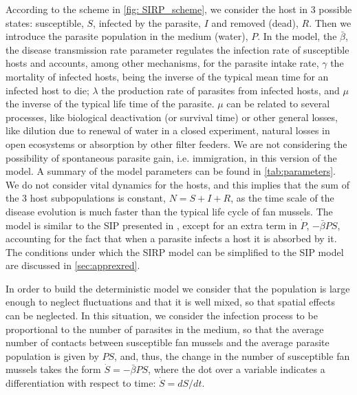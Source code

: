 According to the scheme in \cref{fig: SIRP_scheme}, we consider the host in 3
possible states: susceptible, $S$, infected by the parasite, $I$ and removed
(dead), $R$. Then we introduce the parasite population in the medium (water),
$P$. In the model, the $\bar{\beta}$, the disease transmission rate parameter
regulates the infection rate of susceptible hosts and accounts, among other
mechanisms, for the parasite intake rate,
$\gamma$ the mortality of infected hosts, being the inverse of the typical mean
time for an infected host to die; $\lambda$ the production rate of parasites
from infected hosts, and $\mu$ the inverse of the typical life time of the
parasite. $\mu$ can be related to several processes, like biological
deactivation (or survival time) or other general losses, like dilution due to
renewal of water in a closed experiment, natural losses in open ecosystems or
absorption by other filter feeders.
We are not considering the possibility of spontaneous parasite gain, i.e.
immigration, in this version of the model. A summary of the model parameters
can be found in \cref{tab:parameters}.
We do not consider vital dynamics for the hosts, and this implies that the sum
of the $3$ host subpopulations is constant, $N=S+I+R$, as the time scale of the
disease evolution is much faster than the typical life cycle of fan mussels.
The model is similar to the SIP presented in \cite{article_SIP}, except for an
extra term in $\dot{P}$, $-\bar{\beta}PS$, accounting for the fact that when a
parasite infects a host it is absorbed by it. The conditions under which the
SIRP model can be simplified to the SIP model are discussed in
\cref{sec:apprexred}.

In order to build the deterministic model we consider that the population
is large enough to neglect fluctuations and that it is well mixed, so that
spatial effects can be neglected.
In this situation, we consider the infection process to be proportional to
the number of parasites in the medium, so that the average number of contacts
between susceptible fan mussels and the average parasite population is given by
$PS$, and, thus, the change in the number of susceptible fan mussels takes the
form $\dot{S}=-\bar{\beta} PS$,  where the dot over a variable indicates a
differentiation with respect to time: $\dot{S}=dS/dt$.

